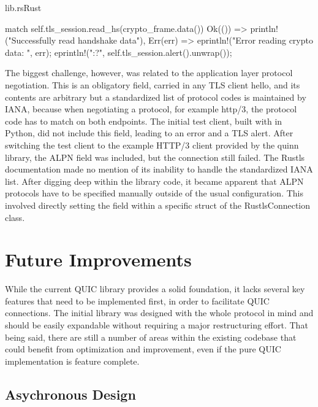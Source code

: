 \begin{codeblock}{lib.rs}{Rust}
    \begin{rustcode}
        match self.tls_session.read_hs(crypto_frame.data()) {
            Ok(()) => println!("Successfully read handshake data"),
            Err(err) => {
                eprintln!("Error reading crypto data: {}", err);
                eprintln!("{:?}", self.tls_session.alert().unwrap());
            }
        }
    \end{rustcode}
    \label{error_handling_read_hs}
\end{codeblock}

The biggest challenge, however, was related to the application layer protocol negotiation. This is an obligatory field, carried
in any TLS client hello, and its contents are arbitrary but a standardized list of protocol codes is maintained by IANA, because
when negotiating a protocol, for example http/3, the protocol code has to match on both endpoints. The initial test client, built
with  in Python, did not include this field, leading to an error and a TLS alert. After switching the test
client to the example HTTP/3 client provided by the quinn library, the ALPN field was included, but the connection still failed.
The Rustls documentation made no mention of its inability to handle the standardized IANA list. After digging deep
within the library code, it became apparent that ALPN protocols have to be specified manually outside of the usual configuration.
This involved directly setting the field within a specific struct of the RustlsConnection class. 

\section{Future Improvements}

While the current QUIC library provides a solid foundation, it lacks several key features that need to be implemented first, in
order to facilitate QUIC connections. The initial library was designed with the whole protocol in mind and should be
easily expandable without requiring a major restructuring effort. That being said, there are still a number of areas within the
existing codebase that could benefit from optimization and improvement, even if the pure QUIC implementation is feature complete.

\subsection{Asychronous Design}

